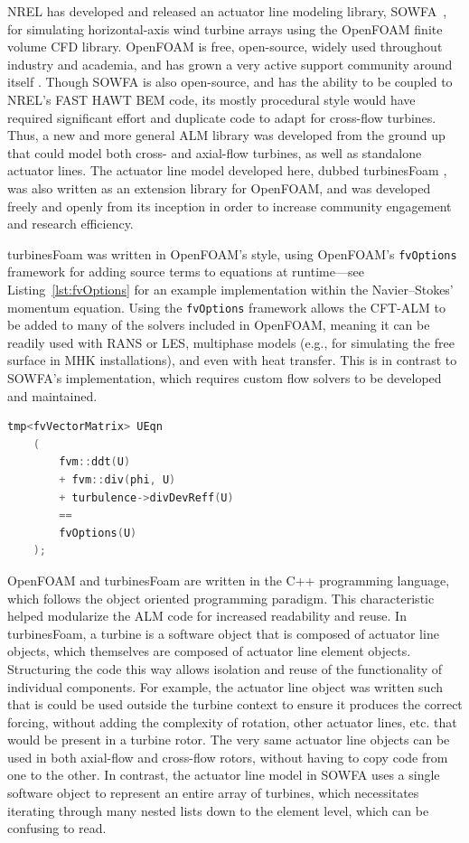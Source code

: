 \documentclass[times]{weauth}
\begin{document}
NREL has developed and released an actuator line modeling library,
SOWFA~\cite{Churchfield2014b}, for simulating horizontal-axis wind turbine
arrays using the OpenFOAM finite volume CFD library. OpenFOAM is free,
open-source, widely used throughout industry and academia, and has grown a very
active support community around itself \cite{Bachant2015-CFD-online}. Though
SOWFA is also open-source, and has the ability to be coupled to NREL's FAST HAWT
BEM code, its mostly procedural style would have required significant effort and
duplicate code to adapt for cross-flow turbines. Thus, a new and more general
ALM library was developed from the ground up that could model both cross- and
axial-flow turbines, as well as standalone actuator lines. The actuator line
model developed here, dubbed turbinesFoam
\cite{Bachant2016-turbinesFoam-v0.0.7}, was also written as an extension library
for OpenFOAM, and was developed freely and openly from its inception in order to
increase community engagement and research efficiency.

turbinesFoam was written in OpenFOAM's style, using OpenFOAM's
\texttt{fvOptions} framework for adding source terms to equations at
runtime---see Listing~\ref{lst:fvOptions} for an example implementation within
the Navier--Stokes' momentum equation. Using the \texttt{fvOptions} framework
allows the CFT-ALM to be added to many of the solvers included in OpenFOAM,
meaning it can be readily used with RANS or LES, multiphase models (e.g., for
simulating the free surface in MHK installations), and even with heat transfer.
This is in contrast to SOWFA's implementation, which requires custom flow
solvers to be developed and maintained.

\begin{lstlisting}[float,language=C++,caption=Adding source terms to the momentum equation in OpenFOAM.,label=lst:fvOptions]
    tmp<fvVectorMatrix> UEqn
    (
        fvm::ddt(U)
        + fvm::div(phi, U)
        + turbulence->divDevReff(U)
        ==
        fvOptions(U)
    );
\end{lstlisting}

OpenFOAM and turbinesFoam are written in the C++ programming language, which
follows the object oriented programming paradigm. This characteristic helped
modularize the ALM code for increased readability and reuse. In turbinesFoam, a
turbine is a software object that is composed of actuator line objects, which
themselves are composed of actuator line element objects. Structuring the code
this way allows isolation and reuse of the functionality of individual
components. For example, the actuator line object was written such that is could
be used outside the turbine context to ensure it produces the correct forcing,
without adding the complexity of rotation, other actuator lines, etc. that would
be present in a turbine rotor. The very same actuator line objects can be used
in both axial-flow and cross-flow rotors, without having to copy code from one
to the other. In contrast, the actuator line model in SOWFA uses a single
software object to represent an entire array of turbines, which necessitates
iterating through many nested lists down to the element level, which can be
confusing to read.
\end{document}

